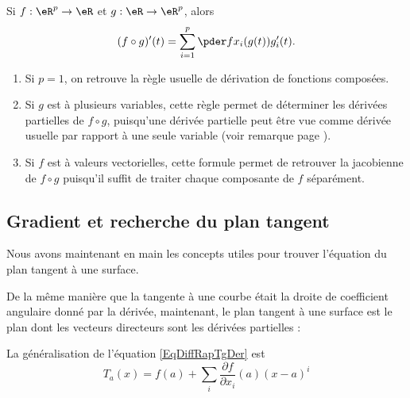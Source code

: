 \begin{corollary} Si $f : \eR^p \to \eR$ et $g : \eR \to
  \eR^p$, alors
  \begin{equation*}
    (f\circ g)^\prime(t) = \sum_{i=1}^p \pder f {x_i}(g(t)) g_i^\prime(t).
  \end{equation*}
\end{corollary}

\begin{remark}
  \begin{enumerate}
  \item Si $p = 1$, on retrouve la règle usuelle de dérivation de
    fonctions composées.

  \item 
      Si $g$ est à plusieurs variables, cette règle permet de déterminer les dérivées partielles de $f \circ g$, puisqu'une dérivée partielle peut être vue comme dérivée usuelle par rapport à une seule variable (voir remarque page \pageref{deriveepartielles}).

  \item Si $f$ est à valeurs vectorielles, cette formule permet de
    retrouver la jacobienne de $f \circ g$ puisqu'il suffit de traiter
    chaque composante de $f$ séparément.
  \end{enumerate}
\end{remark}


                    \subsection{Gradient et recherche du plan tangent}

Nous avons maintenant en main les concepts utiles pour trouver l'équation du plan tangent à une surface.

De la même manière que la tangente à une courbe était la droite de coefficient angulaire donné par la dérivée, maintenant, le plan tangent à une surface est le plan dont les vecteurs directeurs sont les dérivées partielles :

La généralisation de l'équation \eqref{EqDiffRapTgDer} est 
\begin{equation}        \label{EqDefPlanTag}
    T_a(x)=f(a)+\sum_i\frac{ \partial f }{ \partial x_i }(a)(x-a)^i
\end{equation}

